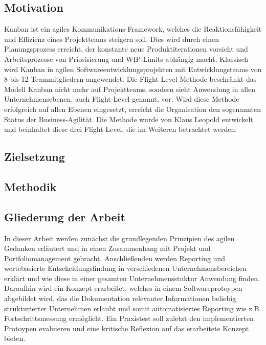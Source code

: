 \subsection{Motivation}
Kanban ist ein agiles Kommunikations-Framework, welches die Reaktionsfähigkeit und Effizienz eines Projektteams steigern soll. Dies wird durch einen Planungsprozess erreicht, der konstante neue Produktiterationen vorsieht und Arbeitsprozesse von Priorisierung und WIP-Limits abhängig macht.
Klassisch wird Kanban in agilen Softwareentwicklungsprojekten mit Entwicklungsteams von 8 bis 12 Teammitgliedern angewendet.
Die Flight-Level Methode beschränkt das Modell Kanban nicht mehr auf Projektteams, sondern sieht Anwendung in allen Unternehmensebenen, auch Flight-Level genannt, vor. Wird diese Methode erfolgreich auf allen Ebenen eingesetzt, erreicht die Organisation den sogenannten Status der Business-Agilität\cite{agilitaetNeuDenken}. 
Die Methode wurde von Klaus Leopold entwickelt und beinhaltet diese drei Flight-Level, die im Weiteren betrachtet werden\cite{agilesProjektmanagementImBerufsalltag}:

\subsection{Zielsetzung}

\subsection{Methodik}

\subsection{Gliederung der Arbeit}
In dieser Arbeit werden zunächst die grundlegenden Prinzipien des agilen Gedanken erläutert und in einen Zusammenhang mit Projekt und Portfoliomanagement gebracht. Anschließenden werden Reporting und wertebasierte Entscheidungsfindung in verschiedenen Unternehmensbereichen erklärt und wie diese in einer gesamten Unternehmensstuktur Anwendung finden. Daraufhin wird ein Konzept erarbeitet, welches in einem Softwareprotoypen abgebildet wird, das die Dokumentation relevanter Informationen beliebig strukturierter Unternehmen erlaubt und somit automatisiertes Reporting wie z.B. Fortschrittsmessung ermöglicht. Ein Praxistest soll zuletzt den implementierten Protoypen evaluieren und eine kritische Reflexion auf das erarbeitete Konzept bieten. 